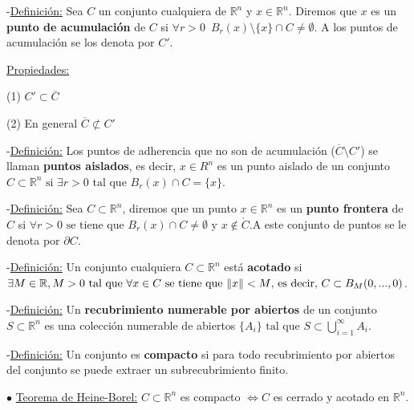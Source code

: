 \documentclass[12pt, titlepage]{article}
\newcommand{\R}{\mathbb{R}}
\newcommand{\spac}{\, \, \,}
\begin{document}
\noindent-\underline{Definición:} Sea $C$ un conjunto cualquiera de $\R^n$ y $x \in \R^n$. Diremos que 
$x$ es un \textbf{punto de acumulación} de $C$ si $\forall{r > 0} \spac B_r(x) \setminus \{x\} \cap C \neq 
\emptyset $. A los puntos de acumulación se los denota por $C'$.
\vspace{3mm}

\underline{Propiedades:}
\vspace{3mm}

\indent \indent (1) $C' \subset \overline{C}$
\vspace{3mm}

\indent \indent (2) En general $\overline{C} \not\subset C'$
\vspace{5mm}

\noindent-\underline{Definición:} Los puntos de adherencia que no son de acumulación ($\overline{C}
 \setminus C'$) se llaman \textbf{puntos aislados}, es decir, $x \in R^n$ es un punto aislado de un conjunto
$C \subset \R^n \text{ si } \exists{r > 0} \text{ tal que } B_r (x) \cap C = \{x\}$.
\vspace{5mm}

\noindent-\underline{Definición:} Sea $C \subset \R^n$, diremos que un punto $x \in \R^n$ es un
 \textbf{punto frontera} de $C$ si $\forall{r > 0} \text{ se tiene que } B_r (x) \cap C \neq \emptyset 
\text{ y } x \not\in \mathring{C}$.A este conjunto de puntos se le denota por $\partial C$.
\vspace{5mm}

\noindent-\underline{Definición:} Un conjunto cualquiera $C \subset \R^n$ está \textbf{acotado} si
$\exists{M \in \R}, \\ M > 0 \text{ tal que } \forall{x \in C} \text{ se tiene que } \|x\| < M \text{, es decir, }
C \subset B_M (0,..., 0)$.
\vspace{5mm}

\noindent-\underline{Definición:} Un \textbf{recubrimiento numerable por abiertos} de un conjunto $S 
\subset \R^n$ es una colección numerable de abiertos $\{A_i\} \text{ tal que } S \subset \displaystyle 
\bigcup_{i=1}^\infty A_i$.
\vspace{3mm}

\noindent-\underline{Definición:} Un conjunto es \textbf{compacto} si para todo recubrimiento por abiertos 
del conjunto se puede extraer un subrecubrimiento finito.
\vspace{5mm}


\noindent$\bullet$ \underline{Teorema de Heine-Borel:} $C \subset \R^n$ es compacto $\iff C$ es cerrado 
y acotado en $\R^n$.
\vspace{3mm}
\end{document}
